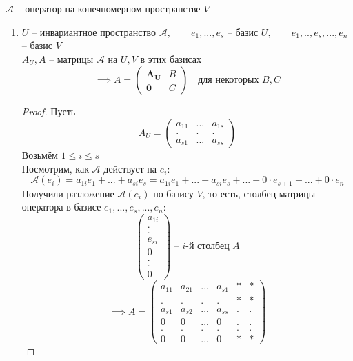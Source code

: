\begin{theorem}
	$ \mathcal{A} $ -- оператор на конечномерном пространстве $ V $
	\begin{enumerate}
		\item $ U $ -- инвариантное пространство $ \mathcal{A}, \qquad e_1, ..., e_s $ -- базис $ U, \qquad e_1, .., e_s, ..., e_n $ -- базис $ V $ \\
		$ A_U, A $ -- матрицы $ \mathcal{A} $ на $ U, V $ в этих базисах
		$$ \implies A =
		\begin{pmatrix}
			\bm{A_U} & B \\
			\bm0 & C
		\end{pmatrix} \quad \text{для некоторых } B, C $$
		\begin{proof}
			Пусть
			$$ A_U =
			\begin{pmatrix}
				a_{11} & ... & a_{1s} \\
				. & . & . \\
				a_{s1} & ... & a_{ss}
			\end{pmatrix} $$
			Возьмём $ 1 \le i \le s $ \\
			Посмотрим, как $ \mathcal{A} $ действует на $ e_i $:
			$$ \mathcal{A}(e_i) = a_{1i}e_1 + ... + a_{si}e_s = a_{1i}e_1 + ... + a_{si}e_s + ... + 0 \cdot e_{s + 1} + ... + 0 \cdot e_n $$
			Получили разложение $ \mathcal{A}(e_i) $ по базису $ V $, то есть, столбец матрицы оператора в базисе $ e_1, ..., e_s, ..., e_n $:
			$$
			\begin{pmatrix}
				a_{1i} \\
				. \\
				. \\
				e_{si} \\
				0 \\
				. \\
				. \\
				0
			\end{pmatrix} \text{ -- } i \text{-й столбец } A $$
			$$ \implies A =
			\begin{pmatrix}
				a_{11} & a_{21} & ... & a_{s1} & * & * \\
				. & . & . & . & * & * \\
				a_{s1} & a_{s2} & ... & a_{ss} & . & . \\
				0 & 0 & ... & 0 & . & . \\
				. & . & . & . & . & . \\
				0 & 0 & ... & 0 & * & *
			\end{pmatrix} $$
		\end{proof}

\end{enumerate}
\end{theorem}
